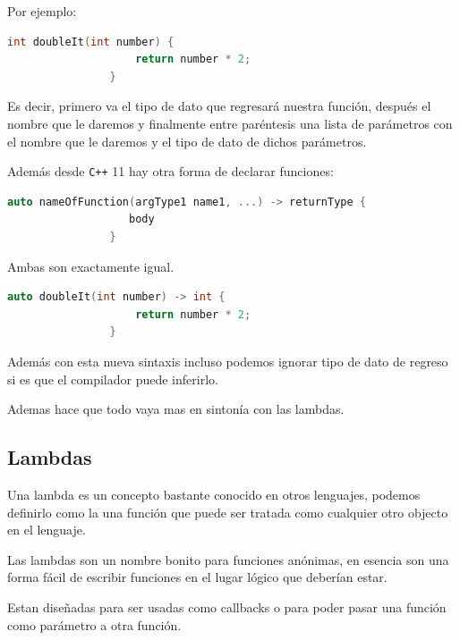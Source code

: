 \documentclass[12pt, fleqn]{report}                             %
\theoremstyle{break}                                            %
\newcommand{\textCode}[1]  { \texttt{#1} }                      %
\newcommand{\Cpp}{\ignorespaces\textCode{C++}}                  %
\begin{document}
            Por ejemplo:
            \begin{lstlisting}[language=C++, gobble=16]
                int doubleIt(int number) {
                    return number * 2;
                }
            \end{lstlisting}

            Es decir, primero va el tipo de dato que regresará nuestra función, después el nombre que le
            daremos y finalmente entre paréntesis una lista de parámetros con el nombre que le daremos y el
            tipo de dato de dichos parámetros.

            Además desde \Cpp 11 hay otra forma de declarar funciones:
            \begin{lstlisting}[language=C++, gobble=16]
                auto nameOfFunction(argType1 name1, ...) -> returnType {
                   body
                }
            \end{lstlisting}

            Ambas son exactamente igual.
            \begin{lstlisting}[language=C++, gobble=16]
                auto doubleIt(int number) -> int {
                    return number * 2;
                }
            \end{lstlisting}

            Además con esta nueva sintaxis incluso podemos ignorar tipo de dato de regreso si es que el
            compilador puede inferirlo.

            Ademas hace que todo vaya mas en sintonía con las lambdas.

            
            \clearpage
            \subsection{Lambdas}

                Una lambda es un concepto bastante conocido en otros lenguajes, podemos definirlo como 
                la una función que puede ser tratada como cualquier otro objecto en el lenguaje.

                Las lambdas son un nombre bonito para funciones anónimas, en esencia son una forma fácil
                de escribir funciones en el lugar lógico que deberían estar.

                Estan diseñadas para ser usadas como callbacks o para poder pasar una función como parámetro
                a otra función.
\end{document}
